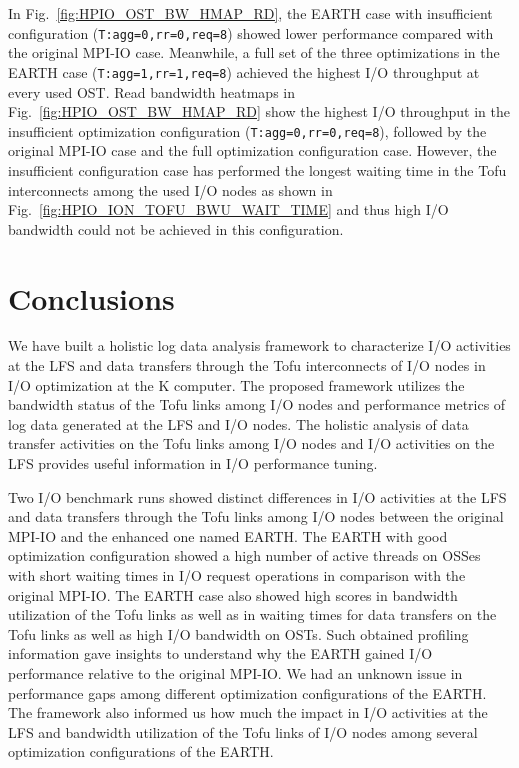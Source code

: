 \documentclass{jhps}
\begin{document}
%
In Fig.~\ref{fig:HPIO_OST_BW_HMAP_RD}, the EARTH case with insufficient configuration
({\tt T:agg=0,rr=0,req=8}) showed lower performance compared with the original MPI-IO case.
Meanwhile, a full set of the three optimizations in the EARTH case
({\tt T:agg=1,rr=1,req=8}) achieved the highest I/O throughput at every used OST. 
Read bandwidth heatmaps in Fig.~\ref{fig:HPIO_OST_BW_HMAP_RD} show
the highest I/O throughput in the insufficient optimization configuration
({\tt T:agg=0,rr=0,req=8}), followed by the original MPI-IO case
and the full optimization configuration case.
However, the insufficient configuration case has performed the longest waiting time
in the Tofu interconnects among the used I/O nodes as shown in
Fig.~\ref{fig:HPIO_ION_TOFU_BWU_WAIT_TIME}
and thus high I/O bandwidth could not be achieved in this configuration.

\section{Conclusions}
\label{sec:CONCLUSIONS}

We have built a holistic log data analysis framework to characterize I/O activities
at the LFS and data transfers through the Tofu interconnects of I/O nodes
in I/O optimization at the K computer.
The proposed framework utilizes the bandwidth status of the Tofu links
among I/O nodes and performance metrics of log data generated at the LFS and I/O nodes.
The holistic analysis of data transfer activities on the Tofu links among I/O nodes
and I/O activities on the LFS provides useful information in I/O performance tuning.

Two I/O benchmark runs showed distinct differences in I/O activities at the LFS
and data transfers through the Tofu links among I/O nodes between the original MPI-IO
and the enhanced one named EARTH.
The EARTH with good optimization configuration showed a high number of active threads
on OSSes with short waiting times in I/O request operations in comparison
with the original MPI-IO. The EARTH case also showed high scores in bandwidth utilization
of the Tofu links as well as in waiting times for data transfers on the Tofu links
as well as high I/O bandwidth on OSTs.
Such obtained profiling information gave insights to understand
why the EARTH gained I/O performance relative to the original MPI-IO.
We had an unknown issue in performance gaps among different optimization configurations
of the EARTH.
The framework also informed us how much the impact in I/O activities at the LFS
and bandwidth utilization of the Tofu links of I/O nodes
among several optimization configurations of the EARTH.
\end{document}
